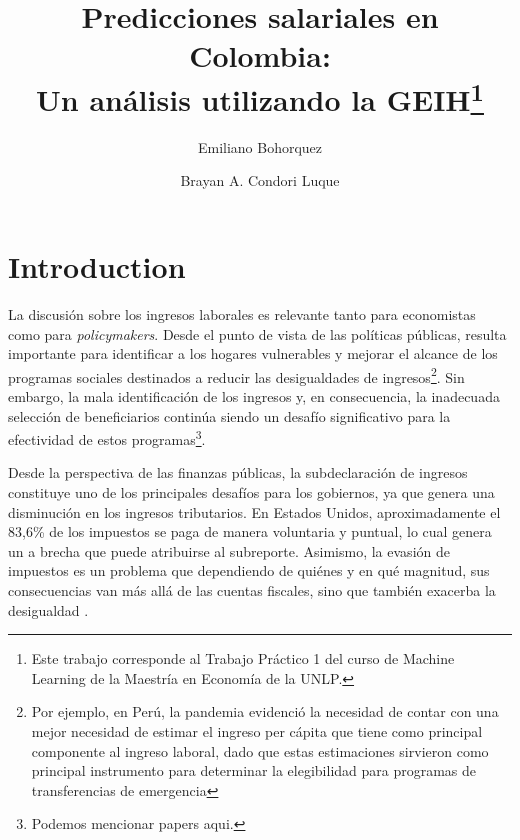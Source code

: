 \documentclass[11pt,oneside]{article}
\begin{document}
	
	
	\title{Predicciones salariales en Colombia: \\
	Un análisis utilizando la GEIH\thanks{Este trabajo corresponde al Trabajo Práctico 1 del curso de Machine Learning de la Maestría en Economía de la UNLP.}}
	
	\author{
		Emiliano Bohorquez \and 
		Brayan A. Condori Luque}
	
	\maketitle
	
	\newpage
	\section{Introduction}

	La discusión sobre los ingresos laborales es relevante tanto para economistas como para \textit{policymakers}. Desde el punto de vista de las políticas públicas, resulta importante para identificar a los hogares vulnerables y mejorar el alcance de los programas sociales destinados a reducir las desigualdades de ingresos\footnote{Por ejemplo, en Perú, la pandemia evidenció la necesidad de contar con una mejor necesidad de estimar el ingreso per cápita que tiene como principal componente al ingreso laboral, dado que estas estimaciones sirvieron como principal instrumento para determinar la elegibilidad para programas de transferencias de emergencia}. Sin embargo, la mala identificación de los ingresos y, en consecuencia, la inadecuada selección de beneficiarios continúa siendo un desafío significativo para la efectividad de estos programas\footnote{Podemos mencionar papers aqui. }.

	Desde la perspectiva de las finanzas públicas, la subdeclaración de ingresos constituye uno de los principales desafíos para los gobiernos, ya que genera una disminución en los ingresos tributarios. En Estados Unidos, aproximadamente el 83,6\% de los impuestos se paga de manera voluntaria y puntual, lo cual genera un a brecha que puede atribuirse al subreporte. Asimismo, la evasión de impuestos es un problema que dependiendo de quiénes y en qué magnitud, sus consecuencias van más allá de las cuentas fiscales, sino que también exacerba la desigualdad \citep{alstadsaeter2019tax}.
	
\end{document}

